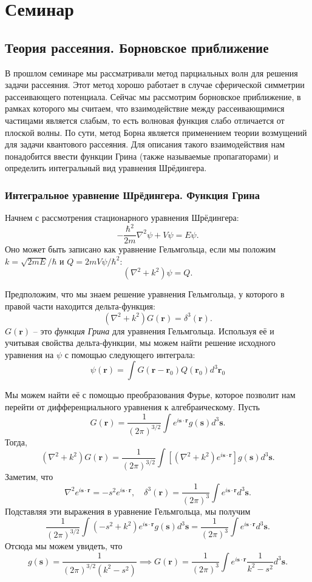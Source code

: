 \section{Семинар \thesection}\label{sem:scattering}
\subsection{Теория рассеяния. Борновское приближение}

В прошлом семинаре мы рассматривали метод парциальных волн для решения задачи
рассеяния. Этот метод хорошо работает в случае сферической симметрии
рассеивающего потенциала. Сейчас мы рассмотрим борновское приближение, в рамках
которого мы считаем, что взаимодействие между рассеивающимися частицами
является слабым, то есть волновая функция слабо отличается от плоской волны. По
сути, метод Борна является применением теории возмущений для задачи квантового
рассеяния. Для описания такого взаимодействия нам понадобится ввести функции
Грина (также называемые пропагаторами) и определить интегральный вид уравнения
Шрёдингера.

\subsubsection{Интегральное уравнение Шрёдингера. Функция Грина}

Начнем с рассмотрения стационарного уравнения Шрёдингера:
\[
  -\frac{\hbar^2}{2m}\nabla^2\psi+V\psi=E\psi.
\]
Оно может быть записано как уравнение Гельмгольца, если мы положим
$k=\sqrt{2mE}/\hbar$ и $Q=2mV\psi/\hbar^2$:
\[
  (\nabla^2+k^2)\psi = Q.
\]

Предположим, что мы знаем решение уравнения Гельмгольца, у которого в правой
части находится дельта-функция:
\[
  (\nabla^2+k^2)G(\textbf{r})=\delta^3(\textbf{r}).
\]
$G(\textbf{r})$ -- это \textit{функция Грина} для уравнения Гельмгольца.
Используя её и учитывая свойства дельта-функции, мы можем найти решение
исходного уравнения на $\psi$ с помощью следующего интеграла:
\[
  \psi(\textbf{r})=\int G(\textbf{r}-\textbf{r}_0)Q(\textbf{r}_0)d^3 \textbf{r}_0
\]

Мы можем найти её с помощью преобразования Фурье, которое позволит нам перейти
от дифференциального уравнения к алгебраическому. Пусть
\[
  G(\textbf{r}) = \frac{1}{(2\pi)^{3/2}}\int e^{i\textbf{s}\cdot\textbf{r}}g(\textbf{s})d^3\textbf{s}.
\]
Тогда,
\[
  (\nabla^2+k^2)G(\textbf{r}) = \frac{1}{(2\pi)^{3/2}}\int\left[(\nabla^2+k^2)e^{i\textbf{s}\cdot\textbf{r}}\right]g(\textbf{s})d^3\textbf{s}.
\]
Заметим, что
\[
  \nabla^2e^{i\textbf{s}\cdot\textbf{r}}=- s^2 e^{i \textbf{s} \cdot \textbf{r}}, \quad \delta^3(\textbf{r})=\frac{1}{(2\pi)^3}\int e^{i\textbf{s}\cdot\textbf{r}}d^3\textbf{s}.
\]
Подставляя эти выражения в уравнение Гельмгольца, мы получим
\[
  \frac{1}{(2\pi)^{3/2}}\int(-s^2+k^2)e^{i\textbf{s}\cdot\textbf{r}}g(\textbf{s})d^3\textbf{s}=\frac{1}{(2\pi)^3}\int e^{i\textbf{s}\cdot\textbf{r}}d^3\textbf{s}.
\]
Отсюда мы можем увидеть, что
\[
  g(\textbf{s})=\frac{1}{(2\pi)^{3/2}(k^2-s^2)} \implies G(\textbf{r})=\frac{1}{(2\pi)^3}\int e^{i\textbf{s}\cdot\textbf{r}}\frac{1}{k^2-s^2}d^3 \textbf{s}.
\]

